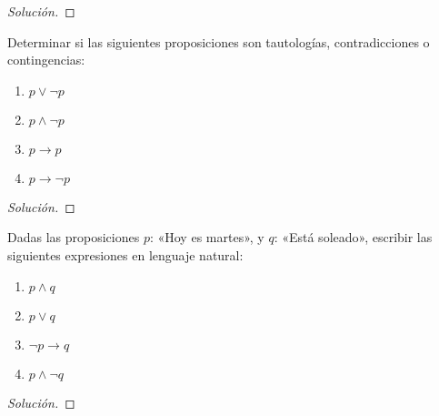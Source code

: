 \documentclass[a4,11pt]{aleph-notas}
\begin{document}
\begin{proof}[Solución]\hspace{0pt}
    
\end{proof}

\begin{ejer}
    Determinar si las siguientes proposiciones son tautologías, contradicciones o contingencias:
    \begin{multicols}{2}
    \begin{enumerate}[label=\textit{\alph*)}]
        \item $p \vee \neg p$
        \item $p \wedge \neg p$
        \item $p \rightarrow p$
        \item $p \rightarrow \neg p$
    \end{enumerate}
    \end{multicols}
    \vspace{0pt}
\end{ejer}

\begin{proof}[Solución]\hspace{0pt}
    
\end{proof}

\begin{ejer}
    Dadas las proposiciones $p$: «Hoy es martes», y $q$: «Está soleado», escribir las siguientes expresiones en lenguaje natural:
    \begin{multicols}{2}
    \begin{enumerate}[label=\textit{\alph*)}]
        \item $p \wedge q$
        \item $p \vee q$
        \item $\neg p \rightarrow q$
        \item $p \wedge \neg q$
    \end{enumerate}
    \end{multicols}
    \vspace{0pt}
\end{ejer}

\begin{proof}[Solución]\hspace{0pt}
    
\end{proof}
\end{document}
